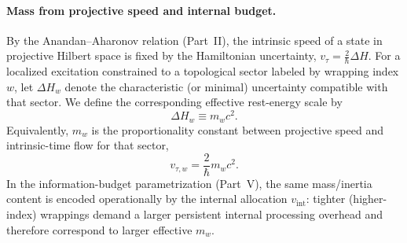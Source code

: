 \paragraph{Mass from projective speed and internal budget.}
By the Anandan--Aharonov relation (Part~II), the intrinsic speed of a state in projective Hilbert space is fixed by the Hamiltonian uncertainty, $v_{\tau}=\frac{2}{\hbar}\Delta H$. For a localized excitation constrained to a topological sector labeled by wrapping index $w$, let $\Delta H_w$ denote the characteristic (or minimal) uncertainty compatible with that sector. We define the corresponding effective rest-energy scale by
\begin{equation}
    \Delta H_w \equiv m_w c^2.
\end{equation}
Equivalently, $m_w$ is the proportionality constant between projective speed and intrinsic-time flow for that sector,
\begin{equation}
    v_{\tau,w} = \frac{2}{\hbar} m_w c^2.
\end{equation}
In the information-budget parametrization (Part~V), the same mass/inertia content is encoded operationally by the internal allocation $v_{\text{int}}$: tighter (higher-index) wrappings demand a larger persistent internal processing overhead and therefore correspond to larger effective $m_w$.

